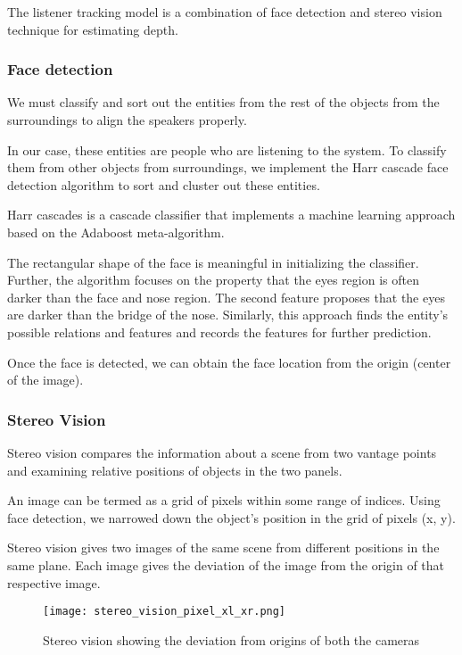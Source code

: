 \documentclass[../../hardware_design_intro/hardware_design_intro.tex]{subfiles}
\begin{document}
    
The listener tracking model is a combination of face detection and stereo vision 
technique for estimating depth.

\subsubsection{Face detection}

We must classify and sort out the entities from the rest of the objects from the 
surroundings to align the speakers properly.

In our case, these entities are people who are listening to the system. To classify 
them from other objects from surroundings, we implement the Harr cascade face detection 
algorithm to sort and cluster out these entities.

Harr cascades is a cascade classifier that implements a machine learning approach based 
on the Adaboost meta-algorithm.

The rectangular shape of the face is meaningful in initializing the classifier. Further, 
the algorithm focuses on the property that the eyes region is often darker than the face 
and nose region. The second feature proposes that the eyes are darker than the bridge of 
the nose. Similarly, this approach finds the entity's possible relations and features 
and records the features for further prediction. 

Once the face is detected, we can obtain the face location from the origin (center of 
the image).

\subsubsection{Stereo Vision}

Stereo vision compares the information about a scene from two vantage points and 
examining relative positions of objects in the two panels.

An image can be termed as a grid of pixels within some range of indices. Using face 
detection, we narrowed down the object's position in the grid of pixels (x, y). 

Stereo vision gives two images of the same scene from different positions in the same 
plane. Each image gives the deviation of the image from the origin of that respective 
image.

\begin{figure*}
    \centering
    \texttt{[image: stereo\_vision\_pixel\_xl\_xr.png]}
    \caption{Stereo vision showing the deviation from origins of both the cameras}
\end{figure*}
\end{document}
